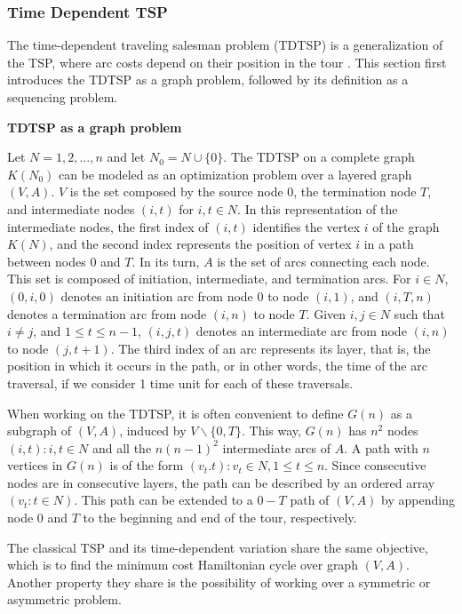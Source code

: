 \subsubsection{Time Dependent TSP}
\label{sec:time-dependent-tsp}

The time-dependent traveling salesman problem (TDTSP) is a generalization of the TSP, where arc costs depend on their position in the tour \cite{time_dependent_tsp, tdtsp_single_machine}. This section first introduces the TDTSP as a graph problem, followed by its definition as a sequencing problem. 

\textbf{TDTSP as a graph problem}

Let $N = {1, 2, ..., n}$ and let $N_{0} = N \cup \{0\}$. The TDTSP on a complete graph $K(N_{0})$ can be modeled as an optimization problem over a layered graph $(V, A)$. $V$ is the set composed by the source node $0$, the termination node $T$, and intermediate nodes $(i, t)$ for $i, t \in N$. In this representation of the intermediate nodes, the first index of $(i, t)$ identifies the vertex $i$ of the graph $K(N)$, and the second index represents the position of vertex $i$ in a path between nodes $0$ and $T$. In its turn, $A$ is the set of arcs connecting each node. This set is composed of initiation, intermediate, and termination arcs. For $i \in N$, $(0, i, 0)$ denotes an initiation arc from node 0 to node $(i, 1)$, and $(i, T, n)$ denotes a termination arc from node $(i, n)$ to node $T$. Given $i, j \in N$ such that $i \neq j$, and $1 \leq t \leq n-1$, $(i,j,t)$ denotes an intermediate arc from node $(i,n)$ to node $(j, t+1)$. The third index of an arc represents its layer, that is, the position in which it occurs in the path, or in other words, the time of the arc traversal, if we consider 1 time unit for each of these traversals.

When working on the TDTSP, it is often convenient to define $G(n)$ as a subgraph of $(V, A)$, induced by $V\backslash\{0, T\}$. This way, $G(n)$ has $n^2$ nodes ${(i, t): i, t \in N}$ and all the $n(n-1)^2$ intermediate arcs of $A$. A path with $n$ vertices in $G(n)$ is of the form ${(v_{t}. t): v_{t} \in N, 1 \leq t \leq n}$. Since consecutive nodes are in consecutive layers, the path can be described by an ordered array $(v_{t}: t \in N)$. This path can be extended to a $0-T$ path of $(V,A)$ by appending node $0$ and $T$ to the beginning and end of the tour, respectively.

The classical TSP and its time-dependent variation share the same objective, which is to find the minimum cost Hamiltonian cycle over graph $(V, A)$. Another property they share is the possibility of working over a symmetric or asymmetric problem.


